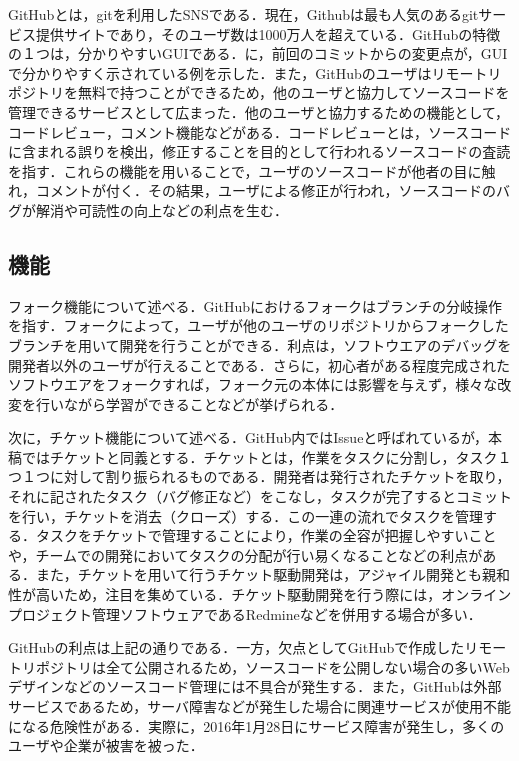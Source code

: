 \documentclass[a4j,9pt,twocolumn]{jsarticle}
\begin{document}
GitHubとは，gitを利用したSNSである．現在，Githubは最も人気のあるgitサービス提供サイトであり，そのユーザ数は1000万人を超えている\cite{github}．GitHubの特徴の１つは，分かりやすいGUIである．に，前回のコミットからの変更点が，GUIで分かりやすく示されている例を示した．また，GitHubのユーザはリモートリポジトリを無料で持つことができるため，他のユーザと協力してソースコードを管理できるサービスとして広まった．他のユーザと協力するための機能として，コードレビュー，コメント機能などがある．コードレビューとは，ソースコードに含まれる誤りを検出，修正することを目的として行われるソースコードの査読を指す．これらの機能を用いることで，ユーザのソースコードが他者の目に触れ，コメントが付く．その結果，ユーザによる修正が行われ，ソースコードのバグが解消や可読性の向上などの利点を生む．

\subsection{機能}
フォーク機能について述べる．GitHubにおけるフォークはブランチの分岐操作を指す．フォークによって，ユーザが他のユーザのリポジトリからフォークしたブランチを用いて開発を行うことができる．利点は，ソフトウエアのデバッグを開発者以外のユーザが行えることである．さらに，初心者がある程度完成されたソフトウエアをフォークすれば，フォーク元の本体には影響を与えず，様々な改変を行いながら学習ができることなどが挙げられる．

次に，チケット機能について述べる．GitHub内ではIssueと呼ばれているが，本稿ではチケットと同義とする．チケットとは，作業をタスクに分割し，タスク１つ１つに対して割り振られるものである．開発者は発行されたチケットを取り，それに記されたタスク（バグ修正など）をこなし，タスクが完了するとコミットを行い，チケットを消去（クローズ）する．この一連の流れでタスクを管理する．タスクをチケットで管理することにより，作業の全容が把握しやすいことや，チームでの開発においてタスクの分配が行い易くなることなどの利点がある．また，チケットを用いて行うチケット駆動開発は，アジャイル開発とも親和性が高いため，注目を集めている．チケット駆動開発を行う際には，オンラインプロジェクト管理ソフトウェアであるRedmineなどを併用する場合が多い．

GitHubの利点は上記の通りである．一方，欠点としてGitHubで作成したリモートリポジトリは全て公開されるため，ソースコードを公開しない場合の多いWebデザインなどのソースコード管理には不具合が発生する．また，GitHubは外部サービスであるため，サーバ障害などが発生した場合に関連サービスが使用不能になる危険性がある．実際に，2016年1月28日にサービス障害が発生し，多くのユーザや企業が被害を被った\cite{news}．
\end{document}
